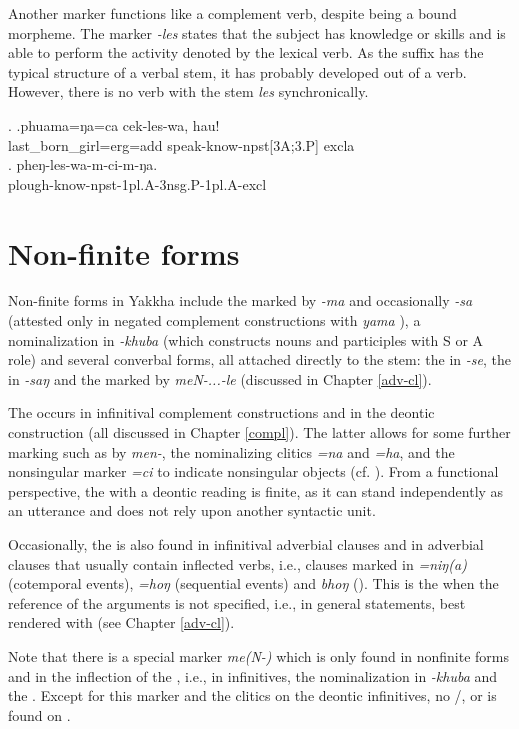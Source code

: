 Another marker functions like a complement verb, despite being  a bound morpheme. The marker \emph{-les} states that the subject has knowledge or skills and is able to perform the activity denoted by the lexical verb. As the suffix has the typical structure of a verbal stem, it has probably developed out of a verb. However, there is no verb with the stem \emph{les} synchronically.

\ex. \ag.phuama=ŋa=ca        cek-les-wa,                hau!\\
last\_born\_girl{\sc =erg=add} speak-know{\sc -npst[3A;3.P]} {\sc excla}\\
 
\bg.        pheŋ-les-wa-m-ci-m-ŋa.\\
plough-know{\sc -npst-1pl.A-3nsg.P-1pl.A-excl}\\
 

\section{Non-finite forms}\label{nonfiniteforms}

Non-finite forms in Yakkha include the  marked by \emph{-ma} and occasionally \emph{-sa} (attested only in negated complement constructions with \emph{yama} ), a nominalization in \emph{-khuba} (which constructs nouns and participles with S or A role) and several converbal forms, all attached directly to the stem: the  in \emph{-se}, the  in \emph{-saŋ} and the  marked by \emph{meN-...-le} (discussed in Chapter \ref{adv-cl}).

The  occurs in infinitival complement constructions and in the deontic construction (all discussed in Chapter \ref{compl}). The latter allows for some further marking such as  by \emph{men-}, the nominalizing clitics \emph{=na} and \emph{=ha}, and the nonsingular marker \emph{=ci} to indicate nonsingular objects (cf. ). From a functional perspective, the  with a deontic reading is finite, as it can stand independently as an utterance and does not rely upon another syntactic unit. 

Occasionally, the  is also found in infinitival adverbial clauses and in adverbial clauses that usually contain inflected verbs, i.e., clauses marked in \emph{=niŋ(a)} (cotemporal events), \emph{=hoŋ} (sequential events) and \emph{bhoŋ} (). This is the  when the reference of the arguments is not specified, i.e., in general statements, best rendered with  (see Chapter \ref{adv-cl}). 

Note that there is a special  marker \emph{me(N-)} which is only found in nonfinite forms and in the inflection of the , i.e., in  infinitives, the nominalization in \emph{-khuba} and  the . Except for this  marker and the clitics on the deontic infinitives, no /,  or  is found on .
